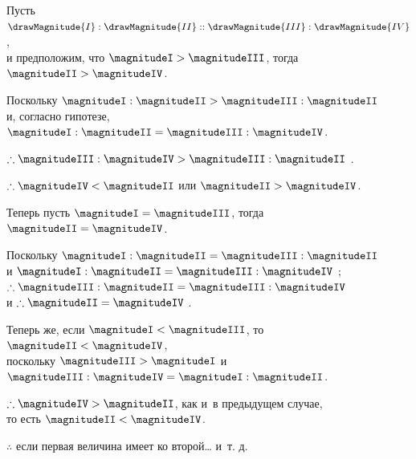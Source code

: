 \documentclass[letters,booklanguage=russian]{byrnebook}
\begin{document}
\begin{center}
Пусть $\drawMagnitude{I} : \drawMagnitude{II} :: \drawMagnitude{III} : \drawMagnitude{IV}$,\\
и предположим, что $\magnitudeI > \magnitudeIII$, тогда $\magnitudeII > \magnitudeIV$.

Поскольку $\magnitudeI : \magnitudeII > \magnitudeIII : \magnitudeII$ \\
и, согласно гипотезе, $\magnitudeI : \magnitudeII = \magnitudeIII : \magnitudeIV$.

$\therefore \magnitudeIII : \magnitudeIV > \magnitudeIII : \magnitudeII$ .

$\therefore \magnitudeIV < \magnitudeII$  или $\magnitudeII > \magnitudeIV$.

Теперь пусть $\magnitudeI = \magnitudeIII$, тогда $\magnitudeII = \magnitudeIV$.

Поскольку $\magnitudeI : \magnitudeII = \magnitudeIII : \magnitudeII$ \\
и $\magnitudeI : \magnitudeII = \magnitudeIII : \magnitudeIV$ \byref{\hypref};\\
$\therefore \magnitudeIII : \magnitudeII = \magnitudeIII : \magnitudeIV$ \\
и $\therefore \magnitudeII = \magnitudeIV$ .

Теперь же, если $\magnitudeI < \magnitudeIII$, то $\magnitudeII < \magnitudeIV$,\\
поскольку $\magnitudeIII > \magnitudeI$ и~$\magnitudeIII : \magnitudeIV = \magnitudeI : \magnitudeII$.

$\therefore \magnitudeIV > \magnitudeII$, как и~в предыдущем случае,\\
то есть $\magnitudeII < \magnitudeIV$.

$\therefore$ если первая величина имеет ко второй… и~т. д.
\end{center}

\vfill\pagebreak

\end{document}
